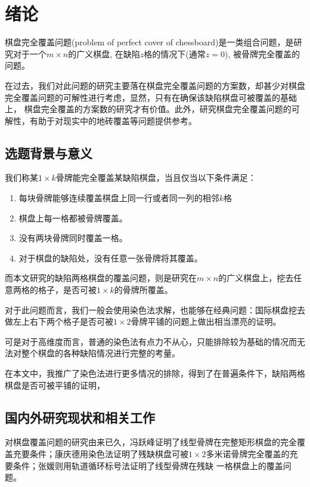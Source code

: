 \chapter{绪论}
棋盘完全覆盖问题(problem of perfect cover of chessboard)是一类组合问题，是研究对于一个$m \times n$的广义棋盘, 在缺陷$z$格的情况下(通常$z=0$), 被骨牌完全覆盖的问题。

在过去，我们对此问题的研究主要落在棋盘完全覆盖问题的方案数，却甚少对棋盘完全覆盖问题的可解性进行考虑，显然，只有在确保该缺陷棋盘可被覆盖的基础上，
棋盘完全覆盖的方案数的研究才有价值。此外，研究棋盘完全覆盖问题的可解性，有助于对现实中的地砖覆盖等问题提供参考。

\section{选题背景与意义}
\label{sec:background}
我们称某$1 \times k$骨牌能完全覆盖某缺陷棋盘，当且仅当以下条件满足：
\begin{enumerate}
    \item 每块骨牌能够连续覆盖棋盘上同一行或者同一列的相邻$k$格
    \item 棋盘上每一格都被骨牌覆盖。
    \item 没有两块骨牌同时覆盖一格。
    \item 对于棋盘的缺陷处，没有任意一张骨牌将其覆盖。
\end{enumerate}

而本文研究的缺陷两格棋盘的覆盖问题，则是研究在$m \times n$的广义棋盘上，挖去任意两格的格子，是否可被$1 \times k$的骨牌所覆盖。

对于此问题而言，我们一般会使用染色法求解，也能够在经典问题：国际棋盘挖去做左上右下两个格子是否可被$1 \times 2$骨牌平铺的问题上做出相当漂亮的证明。

可是对于高维度而言，普通的染色法有点力不从心，只能排除较为基础的情况而无法对整个棋盘的各种缺陷情况进行完整的考量。

在本文中，我推广了染色法进行更多情况的排除，得到了在普遍条件下，缺陷两格棋盘是否可被平铺的证明，

\section{国内外研究现状和相关工作}
\label{sec:related_work}
对棋盘覆盖问题的研究由来已久，冯跃峰证明了线型骨牌在完整矩形棋盘的完全覆盖充要条件；康庆德用染色法证明了残缺棋盘可被$1 \times 2$多米诺骨牌完全覆盖的充要条件；张媛则用轨道循环标号法证明了线型骨牌在残缺
一格棋盘上的覆盖问题。

